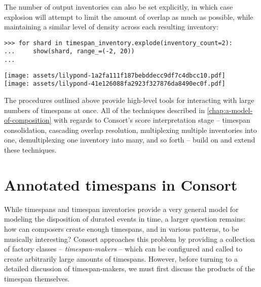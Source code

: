 \noindent The number of output inventories can also be set explicitly, in which
case explosion will attempt to limit the amount of overlap as much as possible,
while maintaining a similar level of density across each resulting inventory:

\begin{comment}
<abjad>
for shard in timespan_inventory.explode(inventory_count=2):
    show(shard, range_=(-2, 20))

</abjad>
\end{comment}

\begin{abjadbookoutput}
\begin{singlespacing}
\vspace{-0.5\baselineskip}
\begin{verbatim}
>>> for shard in timespan_inventory.explode(inventory_count=2):
...     show(shard, range_=(-2, 20))
...
\end{verbatim}
\noindent\texttt{[image: assets/lilypond-1a2fa111f187bebddecc9df7c4dbcc10.pdf]}\\
\noindent\texttt{[image: assets/lilypond-41e126088fa2923f327876da8490ec0f.pdf]}
\end{singlespacing}
\end{abjadbookoutput}

The procedures outlined above provide high-level tools for interacting with
large numbers of timespans at once. All of the techniques described in
\autoref{chap:a-model-of-composition} with regards to Consort's score
interpretation stage -- timespan consolidation, cascading overlap
resolution, multiplexing multiple inventories into one, demultiplexing one
inventory into many, and so forth -- build on and extend these techniques.

\section{Annotated timespans in Consort}
\label{sec:annotated-timespans-in-consort}

While timespans and timespan inventories provide a very general model for
modeling the disposition of durated events in time, a larger question remains:
how can composers create enough timespans, and in various patterns, to be
musically interesting? Consort approaches this problem by providing a
collection of factory classes -- \emph{timespan-makers} -- which can be
configured and called to create arbitrarily large amounts of timespans.
However, before turning to a detailed discussion of timespan-makers, we must
first discuss the products of the timespan themselves.

